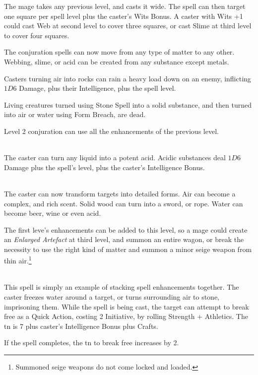 \begin{multicols}{2}
The mage takes any previous level, and casts it wide.  The spell can then target one square per spell level plus the caster's Wits Bonus.  A caster with Wits +1 could cast Web at second level to cover three squares, or cast Slime at third level to cover four squares.

The conjuration spells can now move from any type of matter to any other.  Webbing, slime, or acid can be created from any substance except metals.

Casters turning air into rocks can rain a heavy load down on an enemy, inflicting $1D6$ Damage, plus their Intelligence, plus the spell level.

Living creatures turned using Stone Spell into a solid substance, and then turned into air or water using Form Breach, are dead.

\spelllevel

Level 2 conjuration can use all the enhancements of the previous level.

\\
The caster can turn any liquid into a potent acid.  Acidic substances deal $1D6$ Damage plus the spell's level, plus the caster's Intelligence Bonus.

\\
The caster can now transform targets into detailed forms.  Air can become a complex, and rich scent.  Solid wood can turn into a sword, or rope.  Water can become beer, wine or even acid.

The first leve's enhancements can be added to this level, so a mage could create an \textit{Enlarged Artefact} at third level, and summon an entire wagon, or break the necessity to use the right kind of matter and summon a minor seige weapon from thin air.\footnote{Summoned seige weapons do not come locked and loaded.}

\\
This spell is simply an example of stacking spell enhancements together.  The caster freezes water around a target, or turns surrounding air to stone, imprisoning them.
While the spell is being cast, the target can attempt to break free as a Quick Action, costing 2 Initiative, by rolling Strength + Athletics.
The \gls{tn} is 7 plus caster's Intelligence Bonus plus Crafts.

If the spell completes, the \gls{tn} to break free increases by 2.


\end{multicols}
